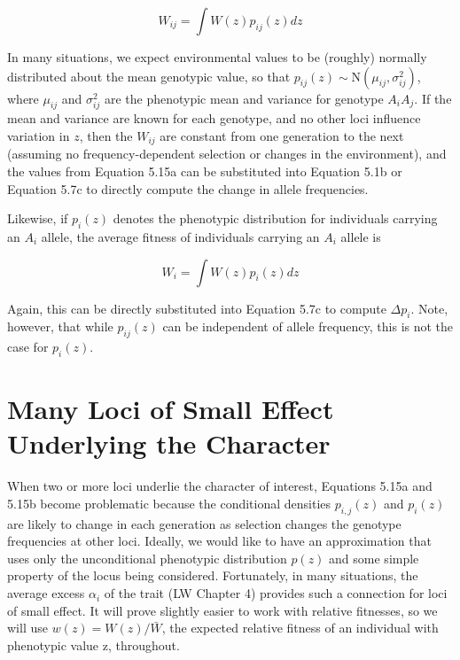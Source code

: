 \documentclass{article}
\begin{document}
\begin{equation}
W_{ij}=\int W(z)p_{ij}(z)dz
\tag{5.15a}
\label{eq:5_15a}
\end{equation}

In many situations, we expect environmental values to be (roughly) normally distributed about the mean genotypic value, so that  $ p_{ij}(z) \sim \mathrm{N}(\mu_{ij}, \sigma_{ij}^{2}) $, where  $ \mu_{ij} $ and  $ \sigma_{ij}^{2} $ are the phenotypic mean and variance for genotype  $ A_i A_j $. If the mean and variance are known for each genotype, and no other loci influence variation in  $ z $, then the  $ W_{ij} $ are constant from one generation to the next (assuming no frequency-dependent selection or changes in the environment), and the values from Equation 5.15a can be substituted into Equation 5.1b or Equation 5.7c to directly compute the change in allele frequencies.

Likewise, if  $ p_{i}(z) $ denotes the phenotypic distribution for individuals carrying an  $ A_{i} $ allele, the average fitness of individuals carrying an  $ A_{i} $ allele is

\begin{equation}
W_{i}=\int W(z)p_{i}(z)d z
\tag{5.15b}
\label{eq:5_15b}
\end{equation}

Again, this can be directly substituted into Equation 5.7c to compute  $ \Delta p_i $. Note, however, that while  $ p_{ij}(z) $ can be independent of allele frequency, this is not the case for  $ p_i(z) $.

\section{Many Loci of Small Effect Underlying the Character}
When two or more loci underlie the character of interest, Equations 5.15a and 5.15b become problematic because the conditional densities  $ p_{i,j}(z) $ and  $ p_{i}(z) $ are likely to change in each generation as selection changes the genotype frequencies at other loci. Ideally, we would like to have an approximation that uses only the unconditional phenotypic distribution  $ p(z) $ and some simple property of the locus being considered. Fortunately, in many situations, the average excess  $ \alpha_{i} $ of the trait (LW Chapter 4) provides such a connection for loci of small effect. It will prove slightly easier to work with relative fitnesses, so we will use  $ w(z) = W(z)/\bar{W} $, the expected relative fitness of an individual with phenotypic value z, throughout.
\end{document}
